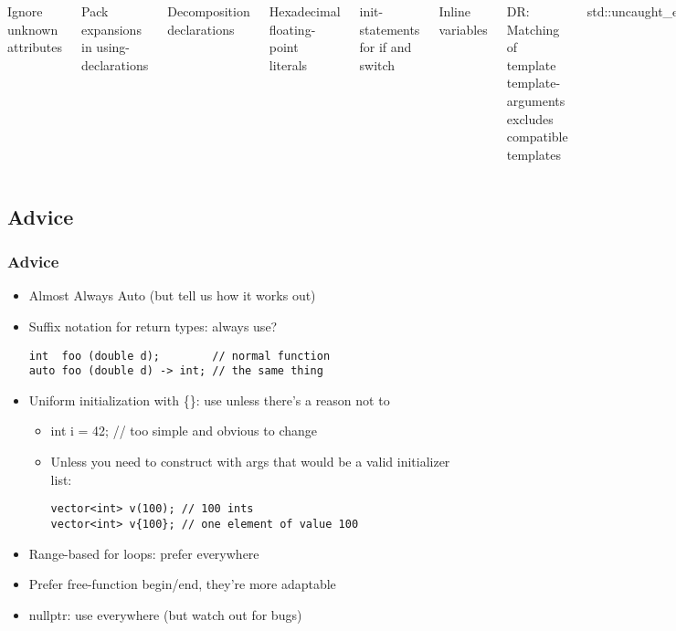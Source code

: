 \begin{frame}[fragile,t]
\begin{columns}[t]
{Ignore unknown attributes

Pack expansions in using-declarations

Decomposition declarations

Hexadecimal floating-point literals

init-statements for if and switch

Inline variables

DR: Matching of template template-arguments excludes compatible templates

std::uncaught\_exceptions()

constexpr if-statements


\vskip 12pt
\url{https://gcc.gnu.org/projects/cxx-status.html#cxx1z}



}

\end{columns}


\end{frame}


\subsection{Advice}
\begin{frame}[fragile,t]
\frametitle{Advice}
\begin{itemize}[<+->]
\item Almost Always Auto (but tell us how it works out)
\item Suffix notation for return types: always use?
{\scriptsize\begin{verbatim}
int  foo (double d);        // normal function
auto foo (double d) -> int; // the same thing
\end{verbatim}
}
\item Uniform initialization with \{\}: use unless there's a reason not to
  \begin{itemize}
  \item int i = 42; // too simple and obvious to change
  \item Unless you need to construct with args that would be a valid initializer list:
\begin{verbatim}
vector<int> v(100); // 100 ints
vector<int> v{100}; // one element of value 100
\end{verbatim}
\end{itemize}
\item Range-based for loops: prefer everywhere
\item Prefer free-function begin/end, they're more adaptable
\item nullptr: use everywhere (but watch out for bugs)

\end{itemize}
\end{frame}

